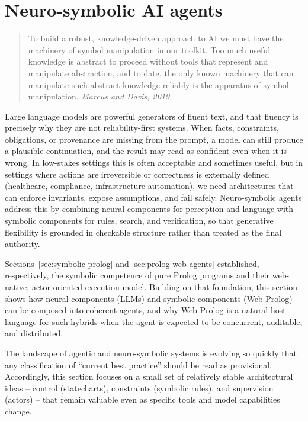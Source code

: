 \section{Neuro-symbolic AI agents}
\label{sec:neuro-symbolic}

\begin{quotation}
\noindent To build a robust, knowledge-driven approach to AI we must have the machinery of symbol manipulation in our toolkit. Too much useful knowledge is abstract to proceed without tools that represent and manipulate abstraction, and to date, the only known machinery that can manipulate such abstract knowledge reliably is the apparatus of symbol manipulation.
\flushright \textit{Marcus and Davis, 2019}
\vspace{0.5cm}
\end{quotation}

\noindent Large language models are powerful generators of fluent text, and that fluency is precisely why they are not reliability-first systems. When facts, constraints, obligations, or provenance are missing from the prompt, a model can still produce a plausible continuation, and the result may read as confident even when it is wrong. In low-stakes settings this is often acceptable and sometimes useful, but in settings where actions are irreversible or correctness is externally defined (healthcare, compliance, infrastructure automation), we need architectures that can enforce invariants, expose assumptions, and fail safely. Neuro-symbolic agents address this by combining neural components for perception and language with symbolic components for rules, search, and verification, so that generative flexibility is grounded in checkable structure rather than treated as the final authority.

Sections~\ref{sec:symbolic-prolog} and \ref{sec:prolog-web-agents} established, respectively, the symbolic competence of pure Prolog programs and their web-native, actor-oriented execution model. Building on that foundation, this section shows how neural components (LLMs) and symbolic components (Web Prolog) can be composed into coherent agents, and why Web Prolog is a natural host language for such hybrids when the agent is expected to be concurrent, auditable, and distributed.

The landscape of agentic and neuro-symbolic systems is evolving so quickly that any classification of ``current best practice'' should be read as provisional. Accordingly, this section focuses on a small set of relatively stable architectural ideas -- control (statecharts), constraints (symbolic rules), and supervision (actors) -- that remain valuable even as specific tools and model capabilities change.

